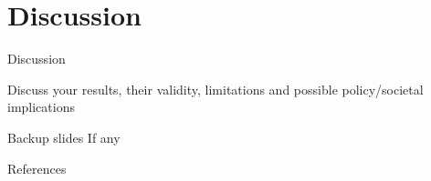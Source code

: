 \documentclass[10pt,xcolor=dvipsnames]{beamer}
\begin{document}
\section{Discussion}

\begin{frame}{Discussion}

Discuss your results, their validity, limitations and possible policy/societal implications

\end{frame}



\appendix

\begin{frame}[fragile]{Backup slides}
  If any
\end{frame}

\begin{frame}[allowframebreaks]{References}

  
  

\end{frame}
\end{document}
